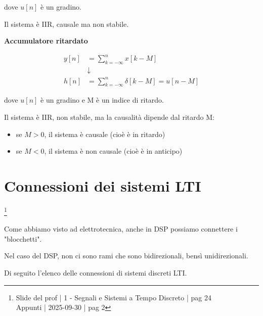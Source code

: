 dove $u \left[ n\right]$ è un gradino. \newline 

Il sistema è IIR, causale ma non stabile. \newline 

\textbf{Accumulatore ritardato} \newline 

{
    \Large 
    \begin{equation}
        \begin{split}
        y \left[ n\right]
        &= 
        \sum_{k = - \infty}^{n}
        x \left[ k - M\right]
       \\
       &\downarrow
       \\
       h \left[ n\right]
       &= 
        \sum_{k = - \infty}^{n} 
        \delta \left[ k - M \right]
        = 
        u \left[ n - M\right]
    \end{split}
    \end{equation}
}

dove $u \left[ n\right]$ è un gradino e M è un indice di ritardo. \newline 

Il sistema è IIR, non stabile, ma la causalità dipende dal ritardo M: 

\begin{itemize}
    \item se $M > 0$, il sistema è causale (cioè è in ritardo)
    \item se $M < 0$, il sistema è non causale (cioè è in anticipo)  
\end{itemize}

\newpage 

\section{Connessioni dei sistemi LTI}

\footnote{ 
    Slide del prof | 1 - Segnali e Sistemi a Tempo Discreto | pag 24\\
    Appunti | 2025-09-30 | pag 2 
}

Come abbiamo visto ad elettrotecnica, anche in DSP possiamo connettere i "blocchetti". \newline 

Nel caso del DSP, non ci sono rami che sono bidirezionali, bensì unidirezionali. \newline 

Di seguito l'elenco delle connessioni di sistemi discreti LTI. \newline 


